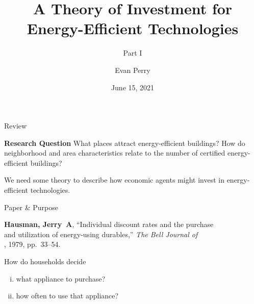\documentclass[11pt]{beamer}
\title{A Theory of Investment for\\ Energy-Efficient Technologies}
\subtitle{Part I}
\author{Evan Perry}
\institute{Spellman Program}
\date{June 15, 2021}
\begin{document}
\maketitlepage


%

\begin{frame}{Review}
\begin{exampleblock}{\large\textbf{Research Question}}
What places attract energy-efficient buildings? How do neighborhood and area characteristics relate to the number of certified energy-efficient buildings?
\end{exampleblock}

\vfill

We need some theory to describe how economic agents might invest in energy-efficient technologies.

\end{frame}


\begin{frame}{Paper \& Purpose}

{\bf Hausman, Jerry~A}, ``Individual discount rates and the purchase\\ 
\quad and  utilization of energy-using durables,'' {\it The Bell Journal of}\\ 
, 1979, pp.~33--54.

\vfill
How do households decide
	\begin{enumerate}[(i)]
		\item what appliance to purchase?
		\item how often to use that appliance?
	\end{enumerate}

\end{frame}




%
%
\end{document}
